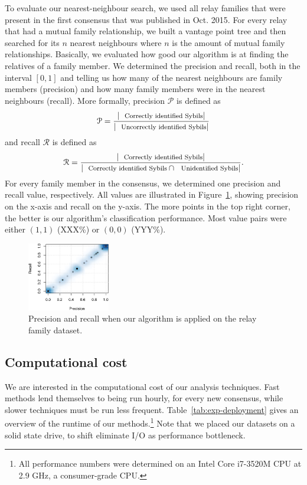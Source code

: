To evaluate our nearest-neighbour search, we used all relay families that were
present in the first consensus that was published in Oct. 2015.   For every relay that had a mutual
family relationship, we built a vantage point tree and then searched for its $n$
nearest neighbours where $n$ is the amount of mutual family relationships.
Basically, we evaluated how good our algorithm is at finding the relatives of a
family member.  We determined the precision and recall, both in the interval
$[0,1]$ and telling us how many of the nearest neighbours are family members
(precision) and how many family members were in the nearest neighbours (recall).
More formally, precision $\mathcal{P}$ is defined as
$$\mathcal{P} = \frac{|\textrm{\footnotesize Correctly identified Sybils}|}
{|\textrm{\footnotesize Uncorrectly identified Sybils}|}$$
and recall $\mathcal{R}$ is defined as
$$\mathcal{R} = \frac{|\textrm{\footnotesize Correctly identified Sybils}|}
{|\textrm{\footnotesize Correctly identified Sybils} \cap \textrm{\footnotesize Unidentified Sybils}|}.$$
For every family member in the consensus, we determined one precision and recall
value, respectively.  All values are illustrated in
Figure~\ref{fig:precision-recall}, showing precision on the x-axis and recall on
the y-axis.  The more points in the top right corner, the better is our
algorithm's classification performance.  Most value pairs were either $(1,1)$
(XXX\%) or $(0,0)$ (YYY\%).

\begin{figure}[t]
	\centering
	\includegraphics[width=0.32\textwidth]{diagrams/precision-recall.pdf}
	\caption{Precision and recall when our algorithm is applied on the relay
		family dataset.}
	\label{fig:precision-recall}
\end{figure}


\subsection{Computational cost}
\label{sec:performance}
We are interested in the computational cost of our analysis techniques.  Fast
methods lend themselves to being run hourly, for every new consensus, while
slower techniques must be run less frequent.  Table~\ref{tab:exp-deployment}
gives an overview of the runtime of our methods.\footnote{All performance
numbers were determined on an Intel Core i7-3520M CPU at 2.9 GHz, a
consumer-grade CPU.}  Note that we
placed our datasets on a solid state drive, to shift eliminate I/O as
performance bottleneck.

